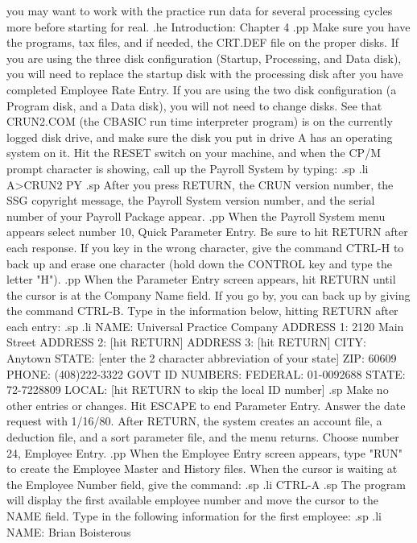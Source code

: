 you may want to work with the practice run data for
several processing cycles more before starting for real.
.he Introduction: Chapter 4
.pp
Make sure you have the programs, tax files, and if needed, the CRT.DEF file
on the proper disks.  If you are using the three disk configuration (Startup,
Processing, and Data disk), you will need to replace the startup disk with
the processing disk after you have completed Employee Rate Entry.
If you are using the two disk configuration (a Program disk, and a Data disk),
you will not need to change disks.
See that CRUN2.COM (the CBASIC run time interpreter
program) is on the currently logged disk drive, and make sure
the disk you put in drive A has an operating system on it. Hit the RESET switch
on your machine, and
when the CP/M prompt character is showing, call up the Payroll System by
typing:
.sp
.li
		A>CRUN2 PY
.sp
After you press RETURN, the CRUN version number, the SSG copyright message,
the Payroll System version number, and
the serial number of your Payroll Package appear.
.pp
When the Payroll System menu appears select number 10, Quick Parameter Entry.
Be sure to hit RETURN after each response.  If you key in the
wrong character, give the command CTRL-H to back up and erase one character
(hold down the CONTROL key and type the letter "H").
.pp
When the Parameter Entry screen appears, hit RETURN until the cursor is
at the Company Name field.  If you go by, you can back up
by giving the command CTRL-B.
Type in the information
below, hitting RETURN after each entry:
.sp
.li
   NAME:       Universal Practice Company
   ADDRESS 1:  2120 Main Street
   ADDRESS 2:  [hit RETURN]
   ADDRESS 3:  [hit RETURN]
   CITY:       Anytown
   STATE:      [enter the 2 character abbreviation of your state]
   ZIP:        60609
   PHONE:      (408)222-3322
   GOVT ID NUMBERS:
     FEDERAL:  01-0092688
     STATE:    72-7228809
     LOCAL:   [hit RETURN to skip the local ID number]
.sp
Make no other entries or changes.  Hit ESCAPE to end Parameter Entry.
Answer the date request with 1/16/80.
After RETURN,
the system creates an account file, a deduction file, and
a sort parameter file, and the menu returns.  Choose number 24, Employee
Entry.
.pp
When the Employee Entry screen appears, type "RUN" to create the Employee
Master and History files.
When the cursor is waiting at the
Employee Number field, give the command:
.sp
.li
		CTRL-A
.sp
The program will display the first available employee number and
move the cursor to the NAME field.  Type in the following information
for the first employee:
.sp
.li
   NAME:      Brian Boisterous
